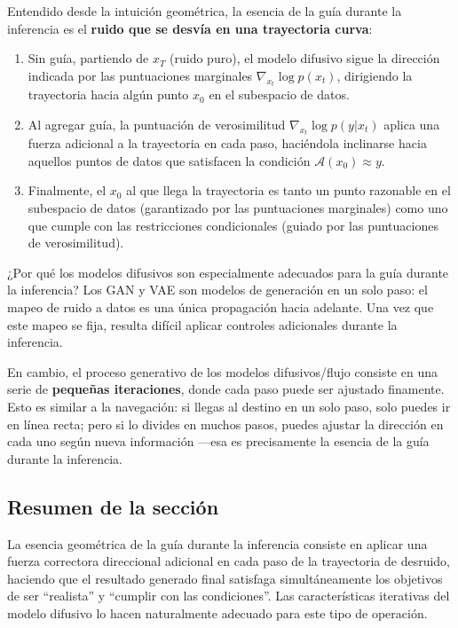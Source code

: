 \documentclass[a4paper]{article}
\begin{document}
Entendido desde la intuición geométrica, la esencia de la guía durante la inferencia es el \textbf{ruido que se desvía en una trayectoria curva}:

\begin{enumerate}
    \item Sin guía, partiendo de $x_T$ (ruido puro), el modelo difusivo sigue la dirección indicada por las puntuaciones marginales $\nabla_{x_t} \log p(x_t)$, dirigiendo la trayectoria hacia algún punto $x_0$ en el subespacio de datos.
    \item Al agregar guía, la puntuación de verosimilitud $\nabla_{x_t} \log p(y|x_t)$ aplica una fuerza adicional a la trayectoria en cada paso, haciéndola inclinarse hacia aquellos puntos de datos que satisfacen la condición $\mathcal{A}(x_0) \approx y$.
    \item Finalmente, el $x_0$ al que llega la trayectoria es tanto un punto razonable en el subespacio de datos (garantizado por las puntuaciones marginales) como uno que cumple con las restricciones condicionales (guiado por las puntuaciones de verosimilitud).
\end{enumerate}

\begin{knowledgebox}{¿Por qué los modelos difusivos son especialmente adecuados para la guía durante la inferencia?}
Los GAN y VAE son modelos de generación en un solo paso: el mapeo de ruido a datos es una única propagación hacia adelante. Una vez que este mapeo se fija, resulta difícil aplicar controles adicionales durante la inferencia.

En cambio, el proceso generativo de los modelos difusivos/flujo consiste en una serie de \textbf{pequeñas iteraciones}, donde cada paso puede ser ajustado finamente. Esto es similar a la navegación: si llegas al destino en un solo paso, solo puedes ir en línea recta; pero si lo divides en muchos pasos, puedes ajustar la dirección en cada uno según nueva información —esa es precisamente la esencia de la guía durante la inferencia.
\end{knowledgebox}

\subsection{Resumen de la sección}

La esencia geométrica de la guía durante la inferencia consiste en aplicar una fuerza correctora direccional adicional en cada paso de la trayectoria de desruido, haciendo que el resultado generado final satisfaga simultáneamente los objetivos de ser ``realista'' y ``cumplir con las condiciones''. Las características iterativas del modelo difusivo lo hacen naturalmente adecuado para este tipo de operación.
\end{document}
